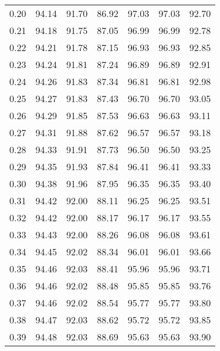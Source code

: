 \begin{tabular}{|c|c|c|c|c|c|c|}
      0.20 &     94.14 &     91.70 &      86.92 &   97.03 &      97.03 &         92.70 \\
      0.21 &     94.18 &     91.75 &      87.05 &   96.99 &      96.99 &         92.78 \\
      0.22 &     94.21 &     91.78 &      87.15 &   96.93 &      96.93 &         92.85 \\
      0.23 &     94.24 &     91.81 &      87.24 &   96.89 &      96.89 &         92.91 \\
      0.24 &     94.26 &     91.83 &      87.34 &   96.81 &      96.81 &         92.98 \\
      0.25 &     94.27 &     91.83 &      87.43 &   96.70 &      96.70 &         93.05 \\
      0.26 &     94.29 &     91.85 &      87.53 &   96.63 &      96.63 &         93.11 \\
      0.27 &     94.31 &     91.88 &      87.62 &   96.57 &      96.57 &         93.18 \\
      0.28 &     94.33 &     91.91 &      87.73 &   96.50 &      96.50 &         93.25 \\
      0.29 &     94.35 &     91.93 &      87.84 &   96.41 &      96.41 &         93.33 \\
      0.30 &     94.38 &     91.96 &      87.95 &   96.35 &      96.35 &         93.40 \\
      0.31 &     94.42 &     92.00 &      88.11 &   96.25 &      96.25 &         93.51 \\
      0.32 &     94.42 &     92.00 &      88.17 &   96.17 &      96.17 &         93.55 \\
      0.33 &     94.43 &     92.00 &      88.26 &   96.08 &      96.08 &         93.61 \\
      0.34 &     94.45 &     92.02 &      88.34 &   96.01 &      96.01 &         93.66 \\
      0.35 &     94.46 &     92.03 &      88.41 &   95.96 &      95.96 &         93.71 \\
      0.36 &     94.46 &     92.02 &      88.48 &   95.85 &      95.85 &         93.76 \\
      0.37 &     94.46 &     92.02 &      88.54 &   95.77 &      95.77 &         93.80 \\
      0.38 &     94.47 &     92.03 &      88.62 &   95.72 &      95.72 &         93.85 \\
      0.39 &     94.48 &     92.03 &      88.69 &   95.63 &      95.63 &         93.90 \\

\end{tabular}
